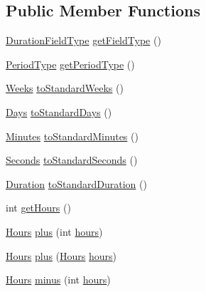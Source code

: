 \subsection*{Public Member Functions}
\begin{DoxyCompactItemize}
\item 
\hyperlink{classorg_1_1joda_1_1time_1_1_duration_field_type}{Duration\-Field\-Type} \hyperlink{classorg_1_1joda_1_1time_1_1_hours_ae63d200bd242684dcb2fae94015153db}{get\-Field\-Type} ()
\item 
\hyperlink{classorg_1_1joda_1_1time_1_1_period_type}{Period\-Type} \hyperlink{classorg_1_1joda_1_1time_1_1_hours_a6340d8bf136206b62d8ac77d8ce5bfcf}{get\-Period\-Type} ()
\item 
\hyperlink{classorg_1_1joda_1_1time_1_1_weeks}{Weeks} \hyperlink{classorg_1_1joda_1_1time_1_1_hours_a6b0d7cd689ec7b9b645c1c119f708161}{to\-Standard\-Weeks} ()
\item 
\hyperlink{classorg_1_1joda_1_1time_1_1_days}{Days} \hyperlink{classorg_1_1joda_1_1time_1_1_hours_af7fa07b2086ea7048aa234619fa5c3ce}{to\-Standard\-Days} ()
\item 
\hyperlink{classorg_1_1joda_1_1time_1_1_minutes}{Minutes} \hyperlink{classorg_1_1joda_1_1time_1_1_hours_ad9f49222a8818a07d21d01994ee53aee}{to\-Standard\-Minutes} ()
\item 
\hyperlink{classorg_1_1joda_1_1time_1_1_seconds}{Seconds} \hyperlink{classorg_1_1joda_1_1time_1_1_hours_a5aff7dfcc23896dab256095b63a9fe00}{to\-Standard\-Seconds} ()
\item 
\hyperlink{classorg_1_1joda_1_1time_1_1_duration}{Duration} \hyperlink{classorg_1_1joda_1_1time_1_1_hours_a09d5c43402951ff0874e5efe4256c5fc}{to\-Standard\-Duration} ()
\item 
int \hyperlink{classorg_1_1joda_1_1time_1_1_hours_a53626f2972932447f4e2544f8d8908d0}{get\-Hours} ()
\item 
\hyperlink{classorg_1_1joda_1_1time_1_1_hours}{Hours} \hyperlink{classorg_1_1joda_1_1time_1_1_hours_a3ba90e3f14f9871ffe63c067e43434e0}{plus} (int \hyperlink{classorg_1_1joda_1_1time_1_1_hours_a6f0261af3e1ae208f32b5deb6b2e13d4}{hours})
\item 
\hyperlink{classorg_1_1joda_1_1time_1_1_hours}{Hours} \hyperlink{classorg_1_1joda_1_1time_1_1_hours_ad5bd55fc0294f1916996aa7bb7683f61}{plus} (\hyperlink{classorg_1_1joda_1_1time_1_1_hours}{Hours} \hyperlink{classorg_1_1joda_1_1time_1_1_hours_a6f0261af3e1ae208f32b5deb6b2e13d4}{hours})
\item 
\hyperlink{classorg_1_1joda_1_1time_1_1_hours}{Hours} \hyperlink{classorg_1_1joda_1_1time_1_1_hours_a8d4dd87d7a6253f5d18c157f32c21559}{minus} (int \hyperlink{classorg_1_1joda_1_1time_1_1_hours_a6f0261af3e1ae208f32b5deb6b2e13d4}{hours})

\end{DoxyCompactItemize}
